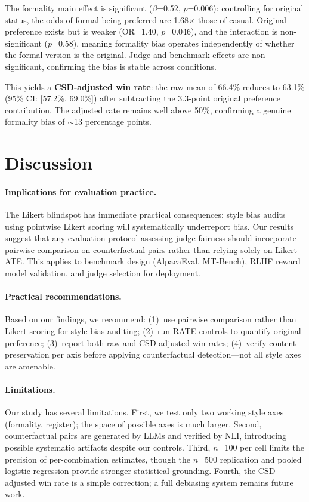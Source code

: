 \documentclass[11pt,a4paper]{article}
\begin{document}
The formality main effect is significant ($\beta$=0.52, $p$=0.006): controlling for original status, the odds of formal being preferred are 1.68$\times$ those of casual.
Original preference exists but is weaker (OR=1.40, $p$=0.046), and the interaction is non-significant ($p$=0.58), meaning formality bias operates independently of whether the formal version is the original.
Judge and benchmark effects are non-significant, confirming the bias is stable across conditions.

This yields a \textbf{CSD-adjusted win rate}: the raw mean of 66.4\% reduces to 63.1\% (95\% CI: [57.2\%, 69.0\%]) after subtracting the 3.3-point original preference contribution.
The adjusted rate remains well above 50\%, confirming a genuine formality bias of $\sim$13 percentage points.

\section{Discussion}

\paragraph{Implications for evaluation practice.}
The Likert blindspot has immediate practical consequences: style bias audits using pointwise Likert scoring will systematically underreport bias.
Our results suggest that any evaluation protocol assessing judge fairness should incorporate pairwise comparison on counterfactual pairs rather than relying solely on Likert ATE.
This applies to benchmark design (AlpacaEval, MT-Bench), RLHF reward model validation, and judge selection for deployment.

\paragraph{Practical recommendations.}
Based on our findings, we recommend: (1)~use pairwise comparison rather than Likert scoring for style bias auditing; (2)~run RATE controls to quantify original preference; (3)~report both raw and CSD-adjusted win rates; (4)~verify content preservation per axis before applying counterfactual detection---not all style axes are amenable.

\paragraph{Limitations.}
Our study has several limitations.
First, we test only two working style axes (formality, register); the space of possible axes is much larger.
Second, counterfactual pairs are generated by LLMs and verified by NLI, introducing possible systematic artifacts despite our controls.
Third, $n$=100 per cell limits the precision of per-combination estimates, though the $n$=500 replication and pooled logistic regression provide stronger statistical grounding.
Fourth, the CSD-adjusted win rate is a simple correction; a full debiasing system remains future work.
\end{document}
